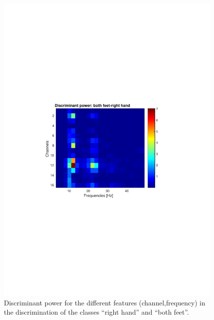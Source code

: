 \begin{figure}[h!]
   \centering
   \includegraphics[width = \textwidth]{images/DP_RHBF.pdf}
   \caption{Discriminant power for the different features (channel,frequency) in the discrimination of the classes ``right hand'' and ``both feet''.}
   \label{fig:DP_RHBF}
\end{figure}
